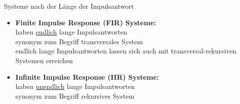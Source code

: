 Systeme nach der Länge der Impulsantwort
\begin{itemize}
	\item \textbf{Finite Impulse Response (FIR) Systeme:}\\
	      \bulletpt haben \underline{endlich} lange Impulsantworten\\
	      \bulletpt synonym zum Begriff transversales System\\
	      \bulletpt endlich lange Impulsantworten lassen sich auch mit
	      transversal-rekursiven Systemen erreichen
	\item \textbf{Infinite Impulse Response (IIR) Systeme:}\\
	      \bulletpt haben \underline{unendlich} lange Impulsantworten\\
	      \bulletpt synonym zum Begriff rekursives System
\end{itemize}
